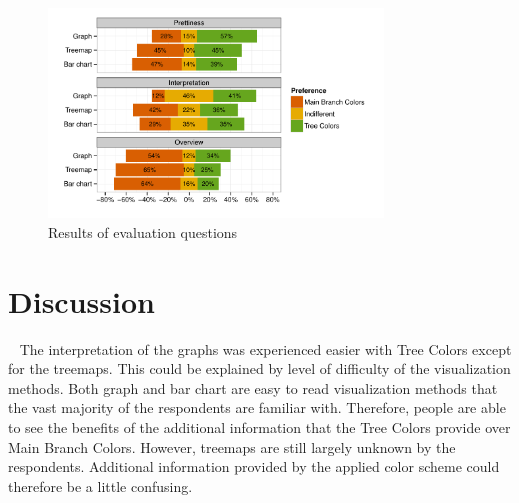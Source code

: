 \documentclass[journal]{vgtc}                %
\begin{document}
\begin{figure}[tb]
  \centering
	\includegraphics[width=3.5in]{user_study_results2.pdf}
  \caption{Results of evaluation questions}\label{fig:user2}
\end{figure}

\section{Discussion}~\label{secdisc}
The interpretation of the graphs was experienced easier with Tree Colors except for the treemaps. This could be explained by level of difficulty of the visualization methods. Both graph and bar chart are easy to read visualization methods that the vast majority of the respondents are familiar with. Therefore, people are able to see the benefits of the additional information that the Tree Colors provide over Main Branch Colors. However, treemaps are still largely unknown by the respondents. Additional information provided by the applied color scheme could therefore be a little confusing.







\end{document}

